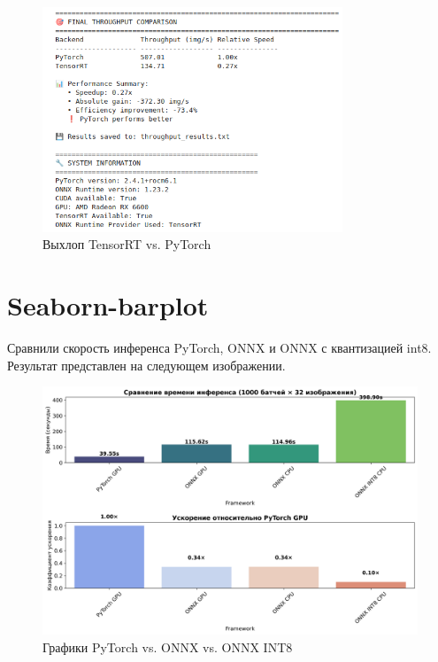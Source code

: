 \documentclass[12pt,a4paper]{article}
\begin{document}
\begin{figure}[ht]
    \centering
    \includegraphics[width=0.8\textwidth]{docs/Screenshot from 2025-10-24 21-46-11.png}
    \caption{Выхлоп TensorRT vs. PyTorch}
    \label{fig:accuracy_plot}
\end{figure}

\section{Seaborn-barplot}

Сравнили скорость инференса PyTorch, ONNX и ONNX с квантизацией int8. Результат представлен на следующем изображении. 

\begin{figure}[ht]
    \centering
    \includegraphics[width=1\textwidth]{docs/speedup.png}
    \caption{Графики PyTorch vs. ONNX vs. ONNX INT8}
    \label{fig:accuracy_plot}
\end{figure}
\end{document}
